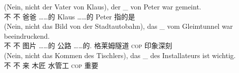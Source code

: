 \eal
\label{ex-nounless-np-relational-noun}
\ex 
\gll (Nein, nicht der Vater von Klaus), der \_ von Peter war gemeint.\\
	\spacebr{}不 不   爸爸 ……的 Klaus  {} ……的 Peter \passivepst{} 指的是\\
\ex 
\gll (Nein, nicht das Bild von der Stadtautobahn), das \_ vom Gleimtunnel war beeindruckend.\\
	 \spacebr{}不 不   图片 ……的  公路  {} ……的. 格莱姆隧道 \textsc{cop} 印象深刻\\
\ex 
\gll (Nein, nicht das Kommen des Tischlers), das \_ des Installateurs ist wichtig.\\
	 \spacebr{}不 不   来  木匠  {}  水管工 \textsc{cop} 重要\\
\zl
%
%
